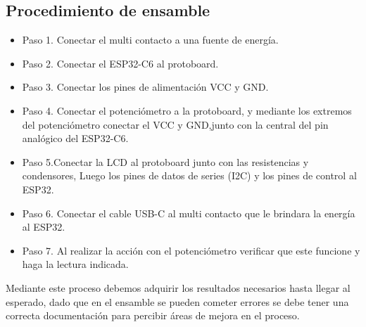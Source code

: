     \subsection{Procedimiento de ensamble}
    \begin{itemize}
        \item Paso 1. Conectar el multi contacto a una fuente de energía.
        \item Paso 2. Conectar el ESP32-C6 al protoboard.
        \item Paso 3. Conectar los pines de alimentación VCC y GND.
        \item Paso 4. Conectar el potenciómetro a la protoboard, y mediante los extremos del potenciómetro conectar el VCC y GND,junto con la central del pin analógico del ESP32-C6.
        \item Paso 5.Conectar la LCD al protoboard junto con las resistencias y condensores, Luego los pines de datos de series (I2C) y los pines de control al ESP32.
        \item Paso 6. Conectar el cable USB-C al multi contacto que le brindara la energía al ESP32.
        \item Paso 7. Al realizar la acción con el potenciómetro verificar que este funcione y haga la lectura indicada. 
    \end{itemize}
    Mediante este proceso debemos adquirir los resultados necesarios hasta llegar al esperado, dado que en el ensamble se pueden cometer errores se debe tener una correcta documentación para percibir áreas de mejora en el proceso.
    
    
